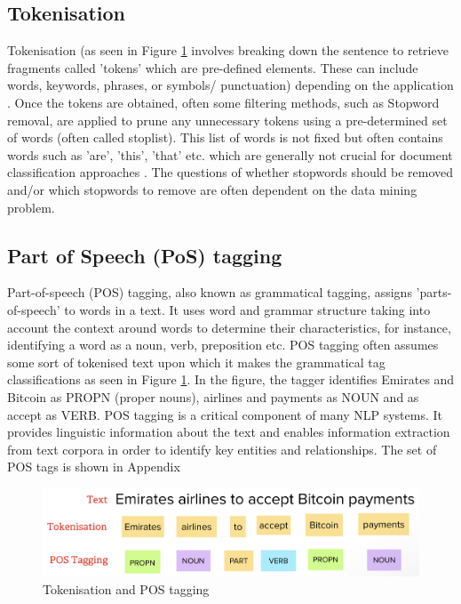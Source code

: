 \subsection{Tokenisation}
Tokenisation (as seen in Figure \ref{fig:tokenisation+pos} involves breaking down the sentence to retrieve fragments called 'tokens' which are pre-defined elements. These can include words, keywords, phrases, or symbols/ punctuation) depending on the application \cite{kannan2014preprocessing} \cite{ieee_named_entity}. Once the tokens are obtained, often some filtering methods, such as Stopword removal, are applied to prune any unnecessary tokens using a pre-determined set of words (often called stoplist). This list of words is not fixed but often contains words such as 'are', 'this', 'that' etc. which are generally not crucial for document classification approaches \cite{kannan2014preprocessing}. The questions of whether stopwords should be removed and/or which stopwords to remove are often dependent on the data mining problem.  

\subsection{Part of Speech (PoS) tagging}

Part-of-speech (POS) tagging, also known as grammatical tagging, assigns 'parts-of-speech' to words in a text.  It uses word and grammar structure taking into account  the context around words to determine their characteristics, for instance, identifying a word as a noun, verb, preposition etc. \cite{pos} POS tagging often assumes some sort of tokenised text upon which it makes the grammatical tag classifications as seen in Figure \ref{fig:tokenisation+pos}. In the figure, the tagger identifies Emirates and Bitcoin as PROPN (proper nouns), airlines and payments as NOUN and as accept as VERB. POS tagging is a critical component of many NLP systems. It provides linguistic information about the text and enables information extraction from text corpora in order to identify key entities and relationships. 
The set of POS tags is shown in Appendix~

\begin{figure}[H]
\centering
\includegraphics[scale=0.35]{images/token+pos.png}
\caption{Tokenisation and POS tagging}
\label{fig:tokenisation+pos}
\end{figure}

